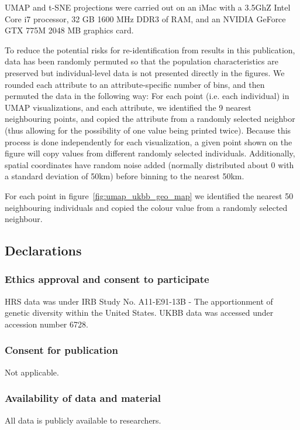\documentclass[12pt]{pnas-new}
\begin{document}
{UMAP and t-SNE projections were carried out on an iMac with a 3.5GhZ Intel Core i7 processor, 32 GB 1600 MHz DDR3 of RAM, and an NVIDIA GeForce GTX 775M 2048 MB graphics card.

To reduce the potential risks for re-identification from results in this publication, data has been randomly permuted so that the population characteristics are preserved but individual-level data is not presented directly in the figures. We rounded each attribute to an attribute-specific number of bins, and then permuted the data in the following way: 
For each point (i.e. each individual) in UMAP visualizations, and each attribute, we identified the 9 nearest neighbouring points, and copied the attribute from a randomly selected neighbor (thus allowing for the possibility of one value being printed twice).  Because this process is done independently for each visualization, a given point shown on the figure will copy values from different randomly selected individuals. Additionally, spatial coordinates have random noise added (normally distributed about 0 with a standard deviation of 50km) before binning to the nearest 50km.

For each point in figure~\ref{fig:umap_ukbb_geo_map} we identified the nearest 50 neighbouring individuals and copied the colour value from a randomly selected neighbour.}

\showmatmethods{} %



\subsection*{Declarations}
\subsubsection*{Ethics approval and consent to participate}
HRS data was under IRB Study No. A11-E91-13B - The apportionment of genetic diversity within the United States. UKBB data was accessed under accession number 6728.

\subsubsection*{Consent for publication} Not applicable.

\subsubsection*{Availability of data and material} All data is publicly available to researchers.
\end{document}
